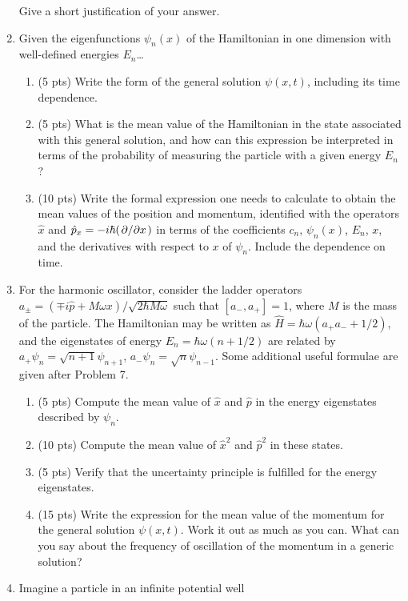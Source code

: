 \documentclass[../notes.tex]{subfiles}
\begin{document}
\begin{enumerate}[label={\textbf{\arabic*.}}]
    Give a short justification of your answer.
    \item Given the eigenfunctions $\psi_n(x)$ of the Hamiltonian in one dimension with well-defined energies $E_n$\dots
    \begin{enumerate}[label={\textbf{\alph*.}}]
        \item (5 pts) Write the form of the general solution $\psi(x,t)$, including its time dependence.
        \item (5 pts) What is the mean value of the Hamiltonian in the state associated with this general solution, and how can this expression be interpreted in terms of the probability of measuring the particle with a given energy $E_n$?
        \item (10 pts) Write the formal expression one needs to calculate to obtain the mean values of the position and momentum, identified with the operators $\hat{x}$ and $\hat{p}_x=-i\hbar(\pdv*{x})$ in terms of the coefficients $c_n$, $\psi_n(x)$, $E_n$, $x$, and the derivatives with respect to $x$ of $\psi_n$. Include the dependence on time.
    \end{enumerate}
    \item For the harmonic oscillator, consider the ladder operators $a_\pm=(\mp i\hat{p}+M\omega x)/\sqrt{2\hbar M\omega}$ such that $[a_-,a_+]=1$, where $M$ is the mass of the particle. The Hamiltonian may be written as $\hat{H}=\hbar\omega(a_+a_-+1/2)$, and the eigenstates of energy $E_n=\hbar\omega(n+1/2)$ are related by $a_+\psi_n=\sqrt{n+1}\psi_{n+1}$, $a_-\psi_n=\sqrt{n}\psi_{n-1}$. Some additional useful formulae are given after Problem 7.
    \begin{enumerate}[label={\textbf{\alph*.}}]
        \item (5 pts) Compute the mean value of $\hat{x}$ and $\hat{p}$ in the energy eigenstates described by $\psi_n$.
        \item (10 pts) Compute the mean value of $\hat{x}^2$ and $\hat{p}^2$ in these states.
        \item (5 pts) Verify that the uncertainty principle is fulfilled for the energy eigenstates.
        \item (15 pts) Write the expression for the mean value of the momentum for the general solution $\psi(x,t)$. Work it out as much as you can. What can you say about the frequency of oscillation of the momentum in a generic solution?
    \end{enumerate}
    \item Imagine a particle in an infinite potential well

\end{enumerate}
\end{document}
